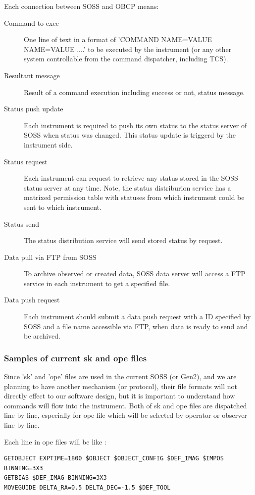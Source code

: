 \documentclass[a4paper,notitlepage]{article}
\begin{document}
Each connection between SOSS and OBCP means: 

\begin{description}
  \item[Command to exec] One line of text in a format of 'COMMAND NAME=VALUE 
    NAME=VALUE ....' to be executed by the instrument (or any other system 
    controllable from the command dispatcher, including TCS). 
  \item[Resultant message] Result of a command execution including success or 
    not, status message.
  \item[Status push update] Each instrument is required to push its own status 
    to the status server of SOSS when status was changed. This status update 
    is triggerd by the instrument side.
  \item[Status request] Each instrument can request to retrieve any status 
    stored in the SOSS status server at any time. Note, the status distriburion 
    service has a matrixed permission table with statuses from which instrument 
    could be sent to which instrument. 
  \item[Status send] The status distribution service will send stored status 
    by request. 
  \item[Data pull via FTP from SOSS] To archive observed or created data, 
    SOSS data server will access a FTP service in each instrument to get 
    a specified file. 
  \item[Data push request] Each instrument should submit a data push request 
    with a ID specified by SOSS and a file name accessible via FTP, when data 
    is ready to send and be archived. 
\end{description}

\subsubsection{Samples of current sk and ope files}

Since 'sk' and 'ope' files are used in the current SOSS (or Gen2), and we are 
planning to have another mechanism (or protocol), their file formats will not 
directly effect to our software design, but it is important to understand 
how commands will flow into the instrument. 
Both of sk and ope files are dispatched line by line, especially for ope file 
which will be selected by operator or observer line by line. 

Each line in ope files will be like : 

\begin{verbatim}
GETOBJECT EXPTIME=1800 $OBJECT $OBJECT_CONFIG $DEF_IMAG $IMPOS BINNING=3X3
GETBIAS $DEF_IMAG BINNING=3X3
MOVEGUIDE DELTA_RA=0.5 DELTA_DEC=-1.5 $DEF_TOOL
\end{verbatim}
\end{document}

